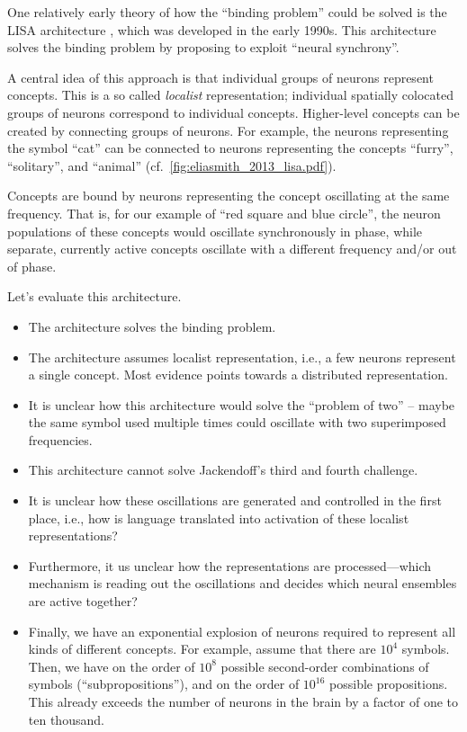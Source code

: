 \documentclass[10pt,letterpaper,oneside]{article}
\begin{document}
One relatively early theory of how the \enquote{binding problem} could be solved is the LISA architecture \cite{hummel2003symbolicconnectionist}, which was developed in the early 1990s. This architecture solves the binding problem by proposing to exploit \enquote{neural synchrony}.

A central idea of this approach is that individual groups of neurons represent concepts. This is a so called \emph{localist} representation; individual spatially colocated groups of neurons correspond to individual concepts. Higher-level concepts can be created by connecting groups of neurons. For example, the neurons representing the symbol \enquote{cat} can be connected to neurons representing the concepts \enquote{furry}, \enquote{solitary}, and \enquote{animal} (cf.~\cref{fig:eliasmith_2013_lisa.pdf}).

Concepts are bound by neurons representing the concept oscillating at the same frequency. That is, for our example of \enquote{red square and blue circle}, the neuron populations of these concepts would oscillate synchronously in phase, while separate, currently active concepts oscillate with a different frequency and/or out of phase.

\newpage

Let's evaluate this architecture.
\begin{itemize}
	\item[\OPlus] The architecture solves the binding problem.
	\item[\OMeh] The architecture assumes localist representation, i.e., a few neurons represent a single concept. Most evidence points towards a distributed representation.
	\item[\OMeh] It is unclear how this architecture would solve the \enquote{problem of two} -- maybe the same symbol used multiple times could oscillate with two superimposed frequencies.
	\item[\OMeh] This architecture cannot solve Jackendoff's third and fourth challenge.
	\item[\OMinus] It is unclear how these oscillations are generated and controlled in the first place, i.e., how is language translated into activation of these localist representations?
	\item[\OMinus] Furthermore, it us unclear how the representations are processed---which mechanism is reading out the oscillations and decides which neural ensembles are active together?
	\item[\OMinus] Finally, we have an exponential explosion of neurons required to represent all kinds of different concepts. For example, assume that there are $10^4$ symbols. Then, we have on the order of $10^8$ possible second-order combinations of symbols (\enquote{subpropositions}), and on the order of $10^{16}$ possible propositions. This already exceeds the number of neurons in the brain by a factor of one to ten thousand.
\end{itemize}
\end{document}
